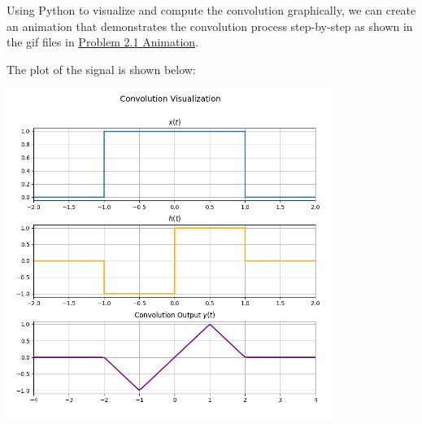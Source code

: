 \documentclass[a4paper, 10pt]{article}
\begin{document}
\begin{tosubmit}
\begin{subproblems}[start=1]
    \item \submitsolution
\end{subproblems}

Using Python to visualize and compute the convolution graphically,
we can create an animation that demonstrates the convolution process step-by-step
as shown in the gif files in \href{https://github.com/patthadon-p/CEDT-2110203-CEM-II/blob/main/signal/homework-2/images/problem_2_1.gif}{Problem 2.1 Animation}.

\vspace{3mm}

The plot of the signal is shown below:
\begin{center}
    \includegraphics[width=0.8\textwidth]{images/problem_2_1_snapshot.png}
\end{center}
\end{tosubmit}

\newpage 
\end{document}
